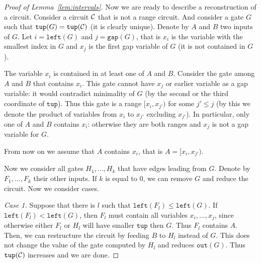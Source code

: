 \documentclass[11pt,letterpaper]{article}
\newcommand{\lef}{\texttt{left}}
\newcommand{\gap}{\texttt{gap}}
\newcommand{\out}{\texttt{out}}
\newcommand{\tup}{\texttt{tup}}
\begin{document}
\begin{proof}[Proof of Lemma~\ref{lem:intervals}]
Now we are ready to describe a reconstruction of a circuit. Consider a circuit ${\cal C}$ that is not a range circuit. And consider a gate $G$ such that $\tup(G)=\tup({\cal C})$ (it is clearly unique). Denote by $A$ and $B$ two inputs of $G$. Let $i=\lef(G)$ and $j=\gap(G)$, that is $x_i$ is the variable with the smallest index in $G$ and $x_j$ is the first gap variable of $G$ (it is not contained in $G$).

The variable $x_i$ is contained in at least one of $A$ and $B$. Consider the gate among $A$ and $B$ that contains $x_i$. This gate cannot have $x_j$ or earlier variable as a gap variable: it would contradict minimality of $G$ (by the second or the third coordinate of $\tup$). Thus this gate is a range $[x_i,x_{j'})$ for some $j'\leq j$ (by this we denote the product of variables from $x_i$ to $x_{j'}$ excluding $x_{j'}$). In particular, only one of $A$ and $B$ contains $x_i$: otherwise they are both ranges and $x_j$ is not a gap variable for $G$.

From now on we assume that $A$ contains $x_i$, that is $A=[x_i,x_{j'})$.

Now we consider all gates $H_1,\ldots, H_k$ that have edges leading from $G$. Denote by $F_1,\ldots, F_k$ their other inputs. If $k$ is equal to $0$, we can remove $G$ and reduce the circuit. Now we consider cases.

\begin{center}
\end{center}

\emph{Case 1.} Suppose that there is $l$ such that $\lef(F_l) \leq \lef(G)$. If $\lef(F_l) < \lef(G)$, then $F_l$ must contain all variables $x_i, \ldots, x_j$, since otherwise either $F_l$ or $H_l$ will have smaller $\tup$ then $G$. Thus $F_l$ contains $A$. Then, we can restructure the circuit by feeding $B$ to $H_l$ instead of $G$. This does not change the value of the gate computed by $H_l$ and reduces $\out(G)$. Thus $\tup({\cal C})$ increases and we are done.


\end{proof}
\end{document}
